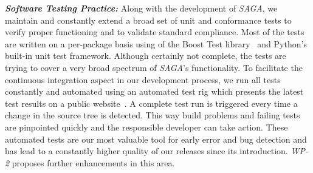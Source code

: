 \documentclass[a4paper,10pt]{article}
\newcommand{\I}[1]{\textit{#1}}
\newcommand{\BI}[1]{\textbf{\textit{#1}}}
\newcommand{\sagaimpl}{\textit{SAGA}\xspace}
\newcommand{\impl}{\sagaimpl}
\begin{document}
\BI{Software Testing Practice:} Along with the development of \impl, we maintain and constantly extend a broad set of unit and conformance tests to verify proper functioning and to validate standard compliance. Most of the tests are written on a per-package basis using of the Boost Test library~\cite{boost_test_web} and Python's built-in unit test framework. Although certainly not complete, the tests are trying to cover a very broad spectrum of \impl's functionality. To facilitate the continuous integration aspect in our development process, we run all tests constantly and automated using an automated test rig\cite{buildbot_web} which presents the latest test results on a public website~\cite{saga_buildbot_web}. A complete test run is triggered every time a change in the source tree is detected. This way build problems and failing tests are pinpointed quickly and the responsible developer can take action. These automated tests are  our most valuable tool for early error and bug detection and has lead to a constantly higher quality of our releases since its introduction. \I{WP-2} proposes further enhancements in this area.


 
  
 
\end{document}
